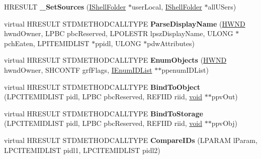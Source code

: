 \begin{DoxyCompactItemize}
\item 
\mbox{\label{class_c_merged_folder_ab1283474ce505cef23b647fd3f556694}} 
H\+R\+E\+S\+U\+LT {\bfseries \+\_\+\+Set\+Sources} (\hyperlink{interface_i_shell_folder}{I\+Shell\+Folder} $\ast$user\+Local, \hyperlink{interface_i_shell_folder}{I\+Shell\+Folder} $\ast$all\+U\+Sers)
\item 
\mbox{\label{class_c_merged_folder_ae07d53d46b3b43df14a64a540cd8785e}} 
virtual H\+R\+E\+S\+U\+LT S\+T\+D\+M\+E\+T\+H\+O\+D\+C\+A\+L\+L\+T\+Y\+PE {\bfseries Parse\+Display\+Name} (\hyperlink{interfacevoid}{H\+W\+ND} hwnd\+Owner, L\+P\+BC pbc\+Reserved, L\+P\+O\+L\+E\+S\+TR lpsz\+Display\+Name, U\+L\+O\+NG $\ast$pch\+Eaten, L\+P\+I\+T\+E\+M\+I\+D\+L\+I\+ST $\ast$ppidl, U\+L\+O\+NG $\ast$pdw\+Attributes)
\item 
\mbox{\label{class_c_merged_folder_a5658d3651db3e0b831270aca65f7a2b6}} 
virtual H\+R\+E\+S\+U\+LT S\+T\+D\+M\+E\+T\+H\+O\+D\+C\+A\+L\+L\+T\+Y\+PE {\bfseries Enum\+Objects} (\hyperlink{interfacevoid}{H\+W\+ND} hwnd\+Owner, S\+H\+C\+O\+N\+TF grf\+Flags, \hyperlink{interface_i_enum_i_d_list}{I\+Enum\+I\+D\+List} $\ast$$\ast$ppenum\+I\+D\+List)
\item 
\mbox{\label{class_c_merged_folder_a9e629d2b375ded9c91a7c3023fd54816}} 
virtual H\+R\+E\+S\+U\+LT S\+T\+D\+M\+E\+T\+H\+O\+D\+C\+A\+L\+L\+T\+Y\+PE {\bfseries Bind\+To\+Object} (L\+P\+C\+I\+T\+E\+M\+I\+D\+L\+I\+ST pidl, L\+P\+BC pbc\+Reserved, R\+E\+F\+I\+ID riid, \hyperlink{interfacevoid}{void} $\ast$$\ast$ppv\+Out)
\item 
\mbox{\label{class_c_merged_folder_a741012821aed034becbc40a99f3e0652}} 
virtual H\+R\+E\+S\+U\+LT S\+T\+D\+M\+E\+T\+H\+O\+D\+C\+A\+L\+L\+T\+Y\+PE {\bfseries Bind\+To\+Storage} (L\+P\+C\+I\+T\+E\+M\+I\+D\+L\+I\+ST pidl, L\+P\+BC pbc\+Reserved, R\+E\+F\+I\+ID riid, \hyperlink{interfacevoid}{void} $\ast$$\ast$ppv\+Obj)
\item 
\mbox{\label{class_c_merged_folder_aad7118b2cc7dc50c43705dfd1ff8230d}} 
virtual H\+R\+E\+S\+U\+LT S\+T\+D\+M\+E\+T\+H\+O\+D\+C\+A\+L\+L\+T\+Y\+PE {\bfseries Compare\+I\+Ds} (L\+P\+A\+R\+AM l\+Param, L\+P\+C\+I\+T\+E\+M\+I\+D\+L\+I\+ST pidl1, L\+P\+C\+I\+T\+E\+M\+I\+D\+L\+I\+ST pidl2)
$$
\end{DoxyCompactItemize}
